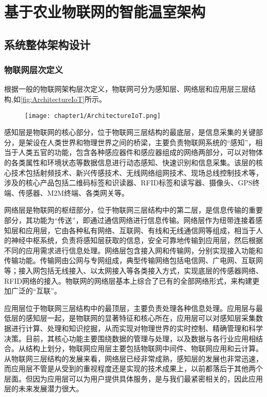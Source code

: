 
\chapter{基于农业物联网的智能温室架构}
\label{chapter:IoT Architecture}

\section{系统整体架构设计}
	\subsection{物联网层次定义}
	根据一般的物联网架构层次定义\supercite{Yu2011Research,LiuQiang2010}，物联网可分为感知层、网络层和应用层三层结构\supercite{HanYi2016A,WangHuaiyu2015},如\ref{fig:ArchitectureIoT}所示。
	\begin{figure}[!htp]
  		\centering
 		\texttt{[image: chapter1/ArchitectureIoT.png]}
	\end{figure}
	感知层是物联网的核心部分，位于物联网三层结构的最底层，是信息采集的关键部分，是架设在人类世界和物理世界之间的桥梁，主要负责物联网系统的“感知”，相当于人类五官的功能，包含各种感应器件和感应器组成的网络两部分，可以对物体的各类属性和环境状态等数据信息进行动态感知、快速识别和信息采集。该层的核心技术包括射频技术、新兴传感技术、无线网络组网技术、现场总线控制技术等，涉及的核心产品包括二维码标签和识读器、RFID标签和读写器、摄像头、GPS终端、传感器、M2M终端、各类网关等。
	
	网络层是物联网的枢纽部分，位于物联网三层结构中的第二层，是信息传输的重要部分，其功能为“传送”，即通过通信网络进行信息传输。网络层作为纽带连接着感知层和应用层，它由各种私有网络、互联网、有线和无线通信网等组成，相当于人的神经中枢系统，负责将感知层获取的信息，安全可靠地传输到应用层，然后根据不同的应用需求进行信息处理。网络层包含接入网和传输网，分别实现接入功能和传输功能。传输网由公网与专网组成，典型传输网络包括电信网、广电网、互联网等；接入网包括无线接入、以太网接入等各类接入方式，实现底层的传感器网络、RFID网络的接入。物联网的网络层基本上综合了已有的全部网络形式，来构建更加广泛的“互联”。
	
	应用层位于物联网三层结构中的最顶层，主要负责处理各种信息处理。应用层与最低层的感知层一起，是物联网的显著特征和核心所在，应用层可以对感知层采集数据进行计算、处理和知识挖掘，从而实现对物理世界的实时控制、精确管理和科学决策。目前，其核心功能主要围绕数据的管理与处理，以及数据与各行业应用相结合。从结构上划分，物联网应用层主要包括物联网中间件、物联网应用和云计算。从物联网三层结构的发展来看，网络层已经非常成熟，感知层的发展也非常迅速，而应用层不管是从受到的重视程度还是实现的技术成果上，以前都落后于其他两个层面。但因为应用层可以为用户提供具体服务，是与我们最紧密相关的，因此应用层的未来发展潜力很大。
	
